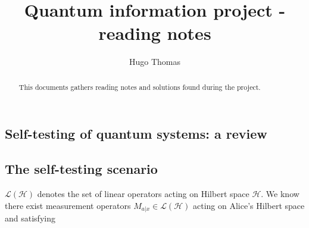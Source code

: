 \documentclass[12pt]{article}
\author{Hugo Thomas}
\title{Quantum information project - reading notes}
\makeatletter
\renewcommand{\maketitle}{\bgroup\setlength{\parindent}{0pt}
\begin{flushleft}
  \textbf{\@title}

  \@author
\end{flushleft}\egroup
}
\makeatother
\begin{document}
\maketitle

\begin{multicols}{2}

\begin{abstract}
	This documents gathers reading notes and solutions found during the project.
\end{abstract}

\vspace{2cm}


\section*{Self-testing of quantum systems: a review
\cite{2020-self-testing-a-review}}

\subsection*{The self-testing scenario}

$\mathscr{L(H)}$ denotes the set of linear operators acting on Hilbert space
$\mathscr H$. We know there exist measurement operators $M_{a|x} \in
\mathscr{L(H)}$ acting on Alice's Hilbert space and satisfying


\end{multicols}
\end{document}
